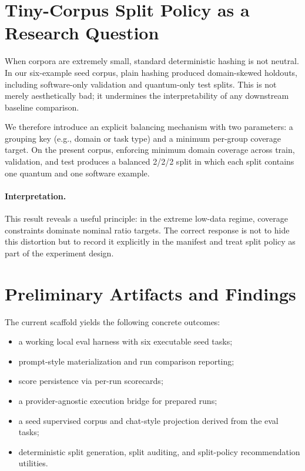 \documentclass[11pt]{article}
\begin{document}
\section{Tiny-Corpus Split Policy as a Research Question}
When corpora are extremely small, standard deterministic hashing is not neutral. In our six-example seed corpus, plain hashing produced domain-skewed holdouts, including software-only validation and quantum-only test splits. This is not merely aesthetically bad; it undermines the interpretability of any downstream baseline comparison.

We therefore introduce an explicit balancing mechanism with two parameters: a grouping key (e.g., domain or task type) and a minimum per-group coverage target. On the present corpus, enforcing minimum domain coverage across train, validation, and test produces a balanced 2/2/2 split in which each split contains one quantum and one software example.

\paragraph{Interpretation.}
This result reveals a useful principle: in the extreme low-data regime, coverage constraints dominate nominal ratio targets. The correct response is not to hide this distortion but to record it explicitly in the manifest and treat split policy as part of the experiment design.

\section{Preliminary Artifacts and Findings}
The current scaffold yields the following concrete outcomes:
\begin{itemize}[leftmargin=1.5em]
    \item a working local eval harness with six executable seed tasks;
    \item prompt-style materialization and run comparison reporting;
    \item score persistence via per-run scorecards;
    \item a provider-agnostic execution bridge for prepared runs;
    \item a seed supervised corpus and chat-style projection derived from the eval tasks;
    \item deterministic split generation, split auditing, and split-policy recommendation utilities.
\end{itemize}
\end{document}
